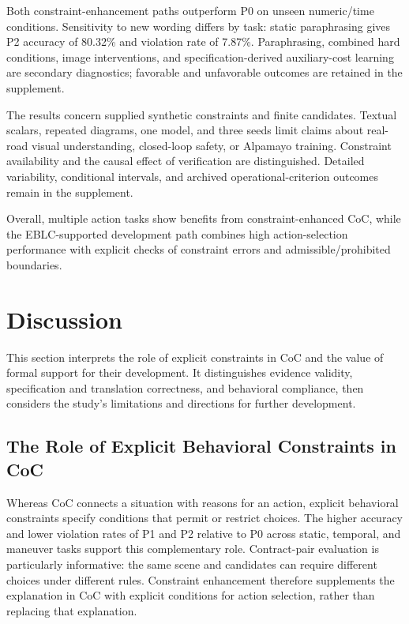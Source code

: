 \documentclass[nolineno]{ieeeaccess}
\begin{document}
Both constraint-enhancement paths outperform P0 on unseen numeric/time conditions. Sensitivity to new wording differs by task: static paraphrasing gives P2 accuracy of 80.32\% and violation rate of 7.87\%. Paraphrasing, combined hard conditions, image interventions, and specification-derived auxiliary-cost learning are secondary diagnostics; favorable and unfavorable outcomes are retained in the supplement.\par

The results concern supplied synthetic constraints and finite candidates. Textual scalars, repeated diagrams, one model, and three seeds limit claims about real-road visual understanding, closed-loop safety, or Alpamayo training. Constraint availability and the causal effect of verification are distinguished. Detailed variability, conditional intervals, and archived operational-criterion outcomes remain in the supplement.\par

Overall, multiple action tasks show benefits from constraint-enhanced CoC, while the EBLC-supported development path combines high action-selection performance with explicit checks of constraint errors and admissible/prohibited boundaries.\par
\section{Discussion}

This section interprets the role of explicit constraints in CoC and the value of formal support for their development. It distinguishes evidence validity, specification and translation correctness, and behavioral compliance, then considers the study's limitations and directions for further development.\par

\subsection{The Role of Explicit Behavioral Constraints in CoC}

Whereas CoC connects a situation with reasons for an action, explicit behavioral constraints specify conditions that permit or restrict choices. The higher accuracy and lower violation rates of P1 and P2 relative to P0 across static, temporal, and maneuver tasks support this complementary role. Contract-pair evaluation is particularly informative: the same scene and candidates can require different choices under different rules. Constraint enhancement therefore supplements the explanation in CoC with explicit conditions for action selection, rather than replacing that explanation.\par
\end{document}
